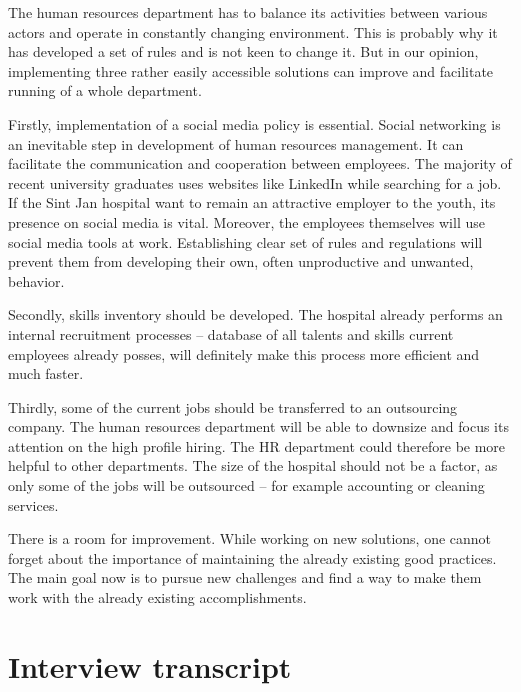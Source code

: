 \documentclass[a4paper,fleqn,11pt,dvips,titlepage]{article}
\numberwithin{figure}{section}
\numberwithin{equation}{section}
\begin{document}
The human resources department has to balance its activities between various actors and operate in constantly changing environment. This is probably why it has developed a set of rules and is not keen to change it. But in our opinion, implementing three rather easily accessible solutions can improve and facilitate running of a whole department. 

Firstly, implementation of a social media policy is essential. Social networking is an inevitable step in development of human resources management. It can facilitate the communication and cooperation between employees. The majority of recent university graduates uses websites like LinkedIn while searching for a job. If the Sint Jan hospital want to remain an attractive employer to the youth, its presence on social media is vital. Moreover, the employees themselves will use social media tools at work. Establishing clear set of rules and regulations will prevent them from developing their own, often unproductive and unwanted, behavior. 

Secondly, skills inventory should be developed. The hospital already performs an internal recruitment processes – database of all talents and skills current employees already posses, will definitely make this process more efficient and much faster. 

Thirdly, some of the current jobs should be transferred to an outsourcing company. The human resources department will be able to downsize and focus its attention on the high profile hiring. The HR department could therefore be more helpful to other departments. The size of the hospital should not be a factor, as only some of the jobs will be outsourced – for example accounting or cleaning services. 

There is a room for improvement. While working on new solutions, one cannot forget about the importance of maintaining the already existing good practices. The main goal now is to pursue new challenges and find a way to make them work with the already existing accomplishments. 

\newpage
{}



\newpage
\appendix

\section{Interview transcript}
\end{document}
